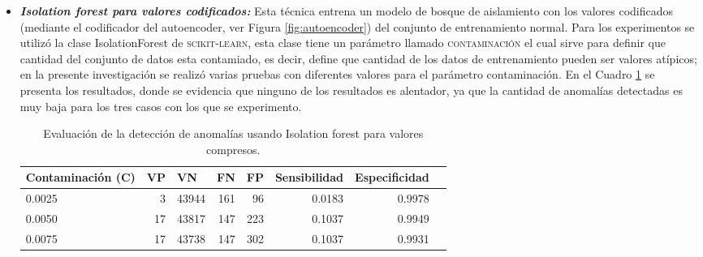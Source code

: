 \begin{itemize}
\item \textbf{\textit{Isolation forest para valores codificados: }}Esta t\'{e}cnica entrena un modelo de bosque de aislamiento con los valores codificados (mediante el codificador del autoencoder, ver Figura \ref{fig:autoencoder}) del conjunto de entrenamiento normal. Para los experimentos se utiliz\'{o} la clase IsolationForest de \textsc{scikit-learn}, esta clase tiene un par\'{a}metro llamado \textsc{contaminaci\'{o}n} el cual sirve para definir que cantidad del conjunto de datos esta contamiado, es decir, define que cantidad de los datos de entrenamiento pueden ser valores at\'{i}picos; en la presente investigaci\'{o}n se realiz\'{o} varias pruebas con diferentes valores para el par\'{a}metro contaminaci\'{o}n. En el Cuadro \ref{table:evaluacion_IF_encoded} se presenta los resultados, donde se evidencia que ninguno de los resultados es alentador, ya que la cantidad de anomal\'{i}as detectadas es muy baja para los tres casos con los que se experimento.

\begin{table}[H]
\centering
\begin{center}
\begin{tabular}{|l|r|r|r|r|r|r|r|}
\hline
\textbf{Contaminaci\'{o}n (C)} & \multicolumn{1}{l|}{\textbf{VP}} & \multicolumn{1}{l|}{\textbf{VN}}& \multicolumn{1}{l|}{\textbf{FN}}& \multicolumn{1}{l|}{\textbf{FP}} & \multicolumn{1}{l|}{\textbf{Sensibilidad}} & \multicolumn{1}{l|}{\textbf{Especificidad}} \\ \hline
0.0025 & \cellcolor[HTML]{AADD99} 3 & \cellcolor[HTML]{AADD99} 43944 & \cellcolor[HTML]{FFCE93} 161 & \cellcolor[HTML]{FFCE93} 96 & 0.0183 & 0.9978 \\ \hline
0.0050 & \cellcolor[HTML]{AADD99} 17 & \cellcolor[HTML]{AADD99} 43817 & \cellcolor[HTML]{FFCE93} 147 & \cellcolor[HTML]{FFCE93} 223 & 0.1037 & 0.9949 \\ \hline
0.0075 & \cellcolor[HTML]{AADD99} 17 & \cellcolor[HTML]{AADD99} 43738 & \cellcolor[HTML]{FFCE93} 147 & \cellcolor[HTML]{FFCE93} 302 & 0.1037 & 0.9931 \\ \hline
\end{tabular}
\end{center}
\caption{Evaluaci\'{o}n de la detecci\'{o}n de anomal\'{i}as usando Isolation forest para valores compresos.}
\label{table:evaluacion_IF_encoded}
\end{table}


\end{itemize}
